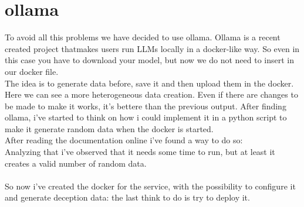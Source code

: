 \section{ollama}
To avoid all this problems we have decided to use ollama. Ollama is a recent created project thatmakes users run LLMs locally in a docker-like way. So even in this case you have to download your model, but now we do not need to insert in our docker file.
\\
The idea is to generate data before, save it and then upload them in the docker.
Here we can see a more heterogeneous data creation. Even if there are changes to be made to make it works, it's bettere than the previous output.
After finding ollama, i've started to think on how i could implement it in a python script to make it generate random data when the docker is started.
\\
After reading the documentation online i've found a way to do so:
\\
Analyzing that i've observed that it needs some time to run, but at least it creates a valid number of random data. 
\\\\
So now i've created the docker for the service, with the possibility to configure it and generate deception data: the last think to do is try to deploy it.
